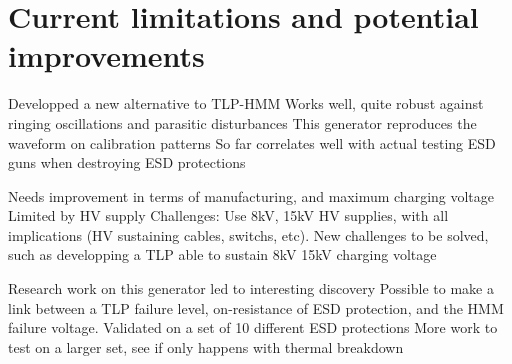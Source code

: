 \section{Current limitations and potential improvements}

Developped a new alternative to TLP-HMM
Works well, quite robust against ringing oscillations and parasitic disturbances
This generator reproduces the waveform on calibration patterns
So far correlates well with actual testing ESD guns when destroying ESD protections

Needs improvement in terms of manufacturing, and maximum charging voltage
Limited by HV supply
Challenges: Use 8kV, 15kV HV supplies, with all implications (HV sustaining cables, switchs, etc).
New challenges to be solved, such as developping a TLP able to sustain 8kV 15kV charging voltage

Research work on this generator led to interesting discovery
Possible to make a link between a TLP failure level, on-resistance of ESD protection, and the HMM failure voltage.
Validated on a set of 10 different ESD protections
More work to test on a larger set, see if only happens with thermal breakdown
